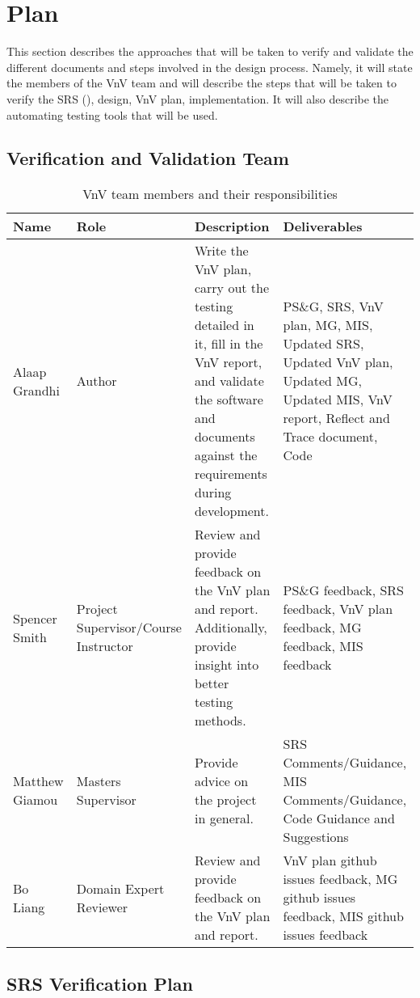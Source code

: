 \documentclass[12pt, titlepage]{article}
\begin{document}
\section{Plan}

This section describes the approaches that will be taken to verify and validate the different documents
and steps involved in the design process. Namely, it will state the members of the VnV team and will describe
the steps that will be taken to verify the SRS (\cite{SRS}), design, VnV plan, implementation. It will also describe the automating
testing tools that will be used.

\subsection{Verification and Validation Team}

\begin{table}[H]
  \centering
  \begin{tabular}{|p{3cm}|p{3cm}|p{3cm}|p{3cm}|}
  \hline
  \textbf{Name} & \textbf{Role} & \textbf{Description} & \textbf{Deliverables}\\ \hline
  Alaap Grandhi & Author & Write the VnV plan, carry out the testing detailed in it, fill in the VnV report, and validate the software and documents against the requirements during development. & PS\&G, SRS, VnV plan, MG, MIS, Updated SRS, Updated VnV plan, Updated MG, Updated MIS, VnV report, Reflect and Trace document, Code\\ \hline
  Spencer Smith & Project Supervisor/Course Instructor & Review and provide feedback on the VnV plan and report. Additionally, provide insight into better testing methods. & PS\&G feedback, SRS feedback, VnV plan feedback, MG feedback, MIS feedback\\ \hline
  Matthew Giamou & Masters Supervisor & Provide advice on the project in general. & SRS Comments/Guidance, MIS Comments/Guidance, Code Guidance and Suggestions \\ \hline
  Bo Liang & Domain Expert Reviewer & Review and provide feedback on the VnV plan and report. & VnV plan github issues feedback, MG github issues feedback, MIS github issues feedback\\ \hline 
  \end{tabular}
  \caption{VnV team members and their responsibilities}
  \label{Table:VnV_Team}
\end{table}

\subsection{SRS Verification Plan}
\end{document}
